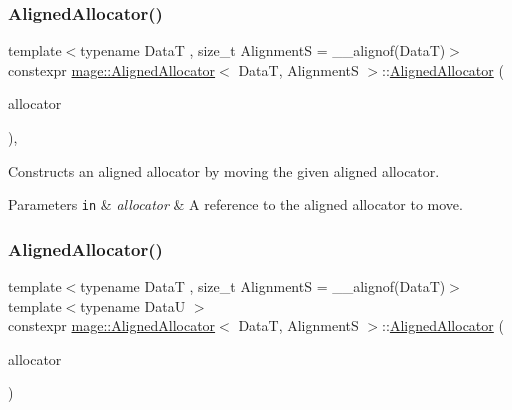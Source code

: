 \subsubsection{\texorpdfstring{Aligned\+Allocator()}{AlignedAllocator()}\hspace{0.1cm}{\footnotesize\ttfamily [3/4]}}
{\footnotesize\ttfamily template$<$typename DataT , size\+\_\+t AlignmentS = \+\_\+\+\_\+alignof(\+Data\+T)$>$ \\
constexpr \hyperlink{structmage_1_1_aligned_allocator}{mage\+::\+Aligned\+Allocator}$<$ DataT, AlignmentS $>$\+::\hyperlink{structmage_1_1_aligned_allocator}{Aligned\+Allocator} (\begin{DoxyParamCaption}\item[{\hyperlink{structmage_1_1_aligned_allocator}{Aligned\+Allocator}$<$ DataT, AlignmentS $>$ \&\&}]{allocator }\end{DoxyParamCaption})\hspace{0.3cm}{\ttfamily [default]}, {\ttfamily [noexcept]}}

Constructs an aligned allocator by moving the given aligned allocator.


\begin{DoxyParams}[1]{Parameters}
\mbox{\tt in}  & {\em allocator} & A reference to the aligned allocator to move. \\
\hline
\end{DoxyParams}
\hypertarget{structmage_1_1_aligned_allocator_a929c971b237449393d7287e2fd0a189a}{}\label{structmage_1_1_aligned_allocator_a929c971b237449393d7287e2fd0a189a} 
\subsubsection{\texorpdfstring{Aligned\+Allocator()}{AlignedAllocator()}\hspace{0.1cm}{\footnotesize\ttfamily [4/4]}}
{\footnotesize\ttfamily template$<$typename DataT , size\+\_\+t AlignmentS = \+\_\+\+\_\+alignof(\+Data\+T)$>$ \\
template$<$typename DataU $>$ \\
constexpr \hyperlink{structmage_1_1_aligned_allocator}{mage\+::\+Aligned\+Allocator}$<$ DataT, AlignmentS $>$\+::\hyperlink{structmage_1_1_aligned_allocator}{Aligned\+Allocator} (\begin{DoxyParamCaption}\item[{const \hyperlink{structmage_1_1_aligned_allocator}{Aligned\+Allocator}$<$ DataU, AlignmentS $>$ \&}]{allocator }\end{DoxyParamCaption})\hspace{0.3cm}{\ttfamily [noexcept]}}

